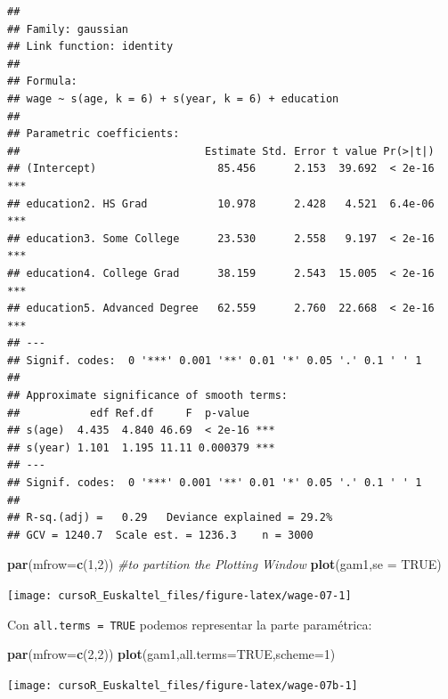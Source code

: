 \documentclass[]{book}
\newenvironment{Shaded}{\begin{snugshade}}{\end{snugshade}}
\newcommand{\KeywordTok}[1]{\textcolor[rgb]{0.13,0.29,0.53}{\textbf{#1}}}
\newcommand{\DataTypeTok}[1]{\textcolor[rgb]{0.13,0.29,0.53}{#1}}
\newcommand{\DecValTok}[1]{\textcolor[rgb]{0.00,0.00,0.81}{#1}}
\newcommand{\CommentTok}[1]{\textcolor[rgb]{0.56,0.35,0.01}{\textit{#1}}}
\newcommand{\OtherTok}[1]{\textcolor[rgb]{0.56,0.35,0.01}{#1}}
\newcommand{\NormalTok}[1]{#1}
\begin{document}
\begin{verbatim}
## 
## Family: gaussian 
## Link function: identity 
## 
## Formula:
## wage ~ s(age, k = 6) + s(year, k = 6) + education
## 
## Parametric coefficients:
##                             Estimate Std. Error t value Pr(>|t|)    
## (Intercept)                   85.456      2.153  39.692  < 2e-16 ***
## education2. HS Grad           10.978      2.428   4.521  6.4e-06 ***
## education3. Some College      23.530      2.558   9.197  < 2e-16 ***
## education4. College Grad      38.159      2.543  15.005  < 2e-16 ***
## education5. Advanced Degree   62.559      2.760  22.668  < 2e-16 ***
## ---
## Signif. codes:  0 '***' 0.001 '**' 0.01 '*' 0.05 '.' 0.1 ' ' 1
## 
## Approximate significance of smooth terms:
##           edf Ref.df     F  p-value    
## s(age)  4.435  4.840 46.69  < 2e-16 ***
## s(year) 1.101  1.195 11.11 0.000379 ***
## ---
## Signif. codes:  0 '***' 0.001 '**' 0.01 '*' 0.05 '.' 0.1 ' ' 1
## 
## R-sq.(adj) =   0.29   Deviance explained = 29.2%
## GCV = 1240.7  Scale est. = 1236.3    n = 3000
\end{verbatim}

\begin{Shaded}
\begin{Highlighting}[]
\KeywordTok{par}\NormalTok{(}\DataTypeTok{mfrow=}\KeywordTok{c}\NormalTok{(}\DecValTok{1}\NormalTok{,}\DecValTok{2}\NormalTok{)) }\CommentTok{#to partition the Plotting Window}
\KeywordTok{plot}\NormalTok{(gam1,}\DataTypeTok{se =} \OtherTok{TRUE}\NormalTok{)}
\end{Highlighting}
\end{Shaded}

\begin{center}\texttt{[image: cursoR\_Euskaltel\_files/figure-latex/wage-07-1]} \end{center}

Con \texttt{all.terms\ =\ TRUE} podemos representar la parte
paramétrica:

\begin{Shaded}
\begin{Highlighting}[]
\KeywordTok{par}\NormalTok{(}\DataTypeTok{mfrow=}\KeywordTok{c}\NormalTok{(}\DecValTok{2}\NormalTok{,}\DecValTok{2}\NormalTok{))}
\KeywordTok{plot}\NormalTok{(gam1,}\DataTypeTok{all.terms=}\OtherTok{TRUE}\NormalTok{,}\DataTypeTok{scheme=}\DecValTok{1}\NormalTok{)}
\end{Highlighting}
\end{Shaded}

\begin{center}\texttt{[image: cursoR\_Euskaltel\_files/figure-latex/wage-07b-1]} \end{center}
\end{document}
